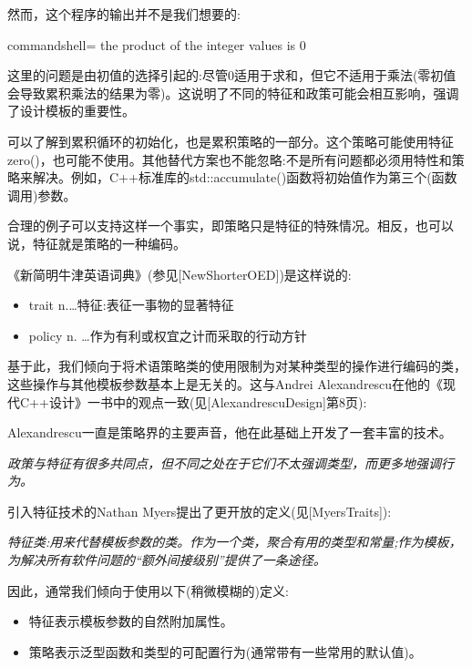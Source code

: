 然而，这个程序的输出并不是我们想要的:

\begin{tcblisting}{commandshell={}}
the product of the integer values is 0
\end{tcblisting}

这里的问题是由初值的选择引起的:尽管0适用于求和，但它不适用于乘法(零初值会导致累积乘法的结果为零)。这说明了不同的特征和政策可能会相互影响，强调了设计模板的重要性。

可以了解到累积循环的初始化，也是累积策略的一部分。这个策略可能使用特征zero()，也可能不使用。其他替代方案也不能忽略:不是所有问题都必须用特性和策略来解决。例如，C++标准库的std::accumulate()函数将初始值作为第三个(函数调用)参数。



合理的例子可以支持这样一个事实，即策略只是特征的特殊情况。相反，也可以说，特征就是策略的一种编码。

《新简明牛津英语词典》(参见[NewShorterOED])是这样说的:

\begin{itemize}
\item 
trait n.…特征:表征一事物的显著特征

\item 
policy n. …作为有利或权宜之计而采取的行动方针
\end{itemize}

基于此，我们倾向于将术语策略类的使用限制为对某种类型的操作进行编码的类，这些操作与其他模板参数基本上是无关的。这与Andrei Alexandrescu在他的《现代C++设计》一书中的观点一致(见[AlexandrescuDesign]第8页):

\begin{tcolorbox}[colback=webgreen!5!white,colframe=webgreen!75!black]
\hspace*{0.75cm}Alexandrescu一直是策略界的主要声音，他在此基础上开发了一套丰富的技术。
\end{tcolorbox}

\textit{政策与特征有很多共同点，但不同之处在于它们不太强调类型，而更多地强调行为。}

引入特征技术的Nathan Myers提出了更开放的定义(见[MyersTraits]):

\textit{特征类:用来代替模板参数的类。作为一个类，聚合有用的类型和常量;作为模板，为解决所有软件问题的“额外间接级别”提供了一条途径。}

因此，通常我们倾向于使用以下(稍微模糊的)定义:

\begin{itemize}
\item 
特征表示模板参数的自然附加属性。

\item 
策略表示泛型函数和类型的可配置行为(通常带有一些常用的默认值)。
\end{itemize}

